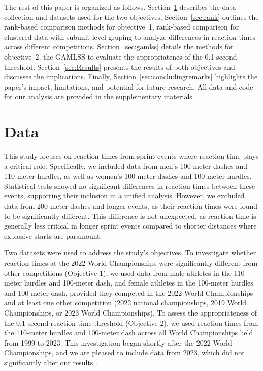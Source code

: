 \documentclass[12pt, letterpaper]{article}
\begin{document}
The rest of this paper is organized as follows. Section~\ref{sec:Data} 
describes the data collection and datasets used for the two
objectives. Section~\ref{sec:rank} outlines the rank-based comparison
methods for objective~1, rank-based comparison for clustered data with
subunit-level gruping to analyze differences in reaction times
across different competitions. Section~\ref{sec:gamlss} details the
methods for objective~2, the GAMLSS to evaluate the appropriatenes
of the 0.1-second threshold. Section~\ref{sec:Results} presents the
results of both objectives and discusses the implications.
Finally, Section~\ref{sec:concludingremarks} highlights the 
paper’s impact, limitations, and potential for future research.
All data and code for our analysis are provided in the supplementary
materials.



\section{Data}
\label{sec:Data}


This study focuses on reaction times from sprint events where reaction
time plays a critical role. Specifically, we included data from men’s
100-meter dashes and 110-meter hurdles, as well as women’s 100-meter
dashes and 100-meter hurdles. Statistical tests showed no significant
differences in reaction times between these events, supporting their
inclusion in a unified analysis. However, we excluded data from
200-meter dashes and longer events, as their reaction times were found
to be significantly different. This difference is not unexpected, as
reaction time is generally less critical in longer sprint events
compared to shorter distances where explosive starts are paramount.


Two datasets were used to address the study's objectives. To
investigate whether reaction times at the 2022 World Championships
were significantly different from other competitions (Objective 1), we
used data from male athletes in the 110-meter hurdles and 100-meter
dash, and female athletes in the 100-meter hurdles and 100-meter dash,
provided they competed in the 2022 World Championships and at least
one other competition (2022 national championships, 2019 World
Championships, or 2023 World Championships). To assess the
appropriateness of the 0.1-second reaction time threshold (Objective
2), we used reaction times from the 110-meter hurdles and 100-meter
dash across all World Championships held from 1999 to 2023. This
investigation began shortly after the 2022 World Championships, and we
are pleased to include data from 2023, which did not significantly
alter our results \citep{WAData}.
\end{document}

